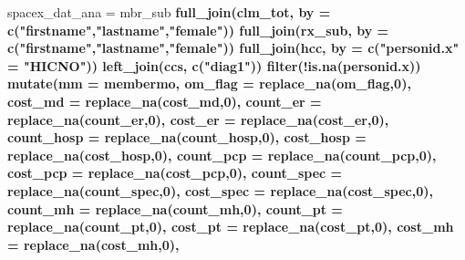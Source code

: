 \documentclass[]{article}
\newenvironment{Shaded}{\begin{snugshade}}{\end{snugshade}}
\newcommand{\KeywordTok}[1]{\textcolor[rgb]{0.13,0.29,0.53}{\textbf{#1}}}
\newcommand{\DataTypeTok}[1]{\textcolor[rgb]{0.13,0.29,0.53}{#1}}
\newcommand{\DecValTok}[1]{\textcolor[rgb]{0.00,0.00,0.81}{#1}}
\newcommand{\StringTok}[1]{\textcolor[rgb]{0.31,0.60,0.02}{#1}}
\newcommand{\OperatorTok}[1]{\textcolor[rgb]{0.81,0.36,0.00}{\textbf{#1}}}
\newcommand{\NormalTok}[1]{#1}
\begin{document}
\begin{Shaded}
\begin{Highlighting}[]
\NormalTok{spacex_dat_ana =}\StringTok{ }\NormalTok{mbr_sub }\OperatorTok{%>%}\StringTok{ }
\StringTok{  }\KeywordTok{full_join}\NormalTok{(clm_tot, }\DataTypeTok{by =} \KeywordTok{c}\NormalTok{(}\StringTok{"firstname"}\NormalTok{,}\StringTok{"lastname"}\NormalTok{,}\StringTok{"female"}\NormalTok{)) }\OperatorTok{%>%}
\StringTok{  }\KeywordTok{full_join}\NormalTok{(rx_sub, }\DataTypeTok{by =} \KeywordTok{c}\NormalTok{(}\StringTok{"firstname"}\NormalTok{,}\StringTok{"lastname"}\NormalTok{,}\StringTok{"female"}\NormalTok{)) }\OperatorTok{%>%}
\StringTok{  }\KeywordTok{full_join}\NormalTok{(hcc, }\DataTypeTok{by =} \KeywordTok{c}\NormalTok{(}\StringTok{"personid.x"}\NormalTok{ =}\StringTok{ "HICNO"}\NormalTok{)) }\OperatorTok{%>%}
\StringTok{  }\KeywordTok{left_join}\NormalTok{(ccs, }\KeywordTok{c}\NormalTok{(}\StringTok{"diag1"}\NormalTok{)) }\OperatorTok{%>%}
\StringTok{  }\KeywordTok{filter}\NormalTok{(}\OperatorTok{!}\KeywordTok{is.na}\NormalTok{(personid.x)) }\OperatorTok{%>%}
\KeywordTok{mutate}\NormalTok{(}\DataTypeTok{mm =}\NormalTok{ membermo,}
       \DataTypeTok{om_flag =} \KeywordTok{replace_na}\NormalTok{(om_flag,}\DecValTok{0}\NormalTok{),}
       \DataTypeTok{cost_md =} \KeywordTok{replace_na}\NormalTok{(cost_md,}\DecValTok{0}\NormalTok{),}
       \DataTypeTok{count_er =} \KeywordTok{replace_na}\NormalTok{(count_er,}\DecValTok{0}\NormalTok{),}
       \DataTypeTok{cost_er =} \KeywordTok{replace_na}\NormalTok{(cost_er,}\DecValTok{0}\NormalTok{),}
       \DataTypeTok{count_hosp =} \KeywordTok{replace_na}\NormalTok{(count_hosp,}\DecValTok{0}\NormalTok{),}
       \DataTypeTok{cost_hosp =} \KeywordTok{replace_na}\NormalTok{(cost_hosp,}\DecValTok{0}\NormalTok{),}
       \DataTypeTok{count_pcp =} \KeywordTok{replace_na}\NormalTok{(count_pcp,}\DecValTok{0}\NormalTok{),}
       \DataTypeTok{cost_pcp =} \KeywordTok{replace_na}\NormalTok{(cost_pcp,}\DecValTok{0}\NormalTok{),}
       \DataTypeTok{count_spec =} \KeywordTok{replace_na}\NormalTok{(count_spec,}\DecValTok{0}\NormalTok{),}
       \DataTypeTok{cost_spec =} \KeywordTok{replace_na}\NormalTok{(cost_spec,}\DecValTok{0}\NormalTok{),}
       \DataTypeTok{count_mh =} \KeywordTok{replace_na}\NormalTok{(count_mh,}\DecValTok{0}\NormalTok{),}
       \DataTypeTok{count_pt =} \KeywordTok{replace_na}\NormalTok{(count_pt,}\DecValTok{0}\NormalTok{),}
       \DataTypeTok{cost_pt =} \KeywordTok{replace_na}\NormalTok{(cost_pt,}\DecValTok{0}\NormalTok{),}
       \DataTypeTok{cost_mh =} \KeywordTok{replace_na}\NormalTok{(cost_mh,}\DecValTok{0}\NormalTok{),}
}}}}}}
\end{Highlighting}
\end{Shaded}
\end{document}
